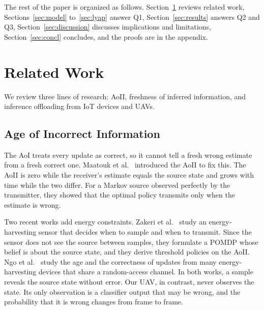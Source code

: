 \documentclass[journal]{IEEEtran}
\theoremstyle{remark}
\begin{document}
The rest of the paper is organized as follows. Section~\ref{sec:related} reviews related work, Sections~\ref{sec:model} to~\ref{sec:lyap} answer Q1, Section~\ref{sec:results} answers Q2 and Q3, Section~\ref{sec:discussion} discusses implications and limitations, Section~\ref{sec:concl} concludes, and the proofs are in the appendix.
\section{Related Work}\label{sec:related}
We review three lines of research: AoII, freshness of inferred information, and inference offloading from IoT devices and UAVs.

\subsection{Age of Incorrect Information}
The AoI treats every update as correct, so it cannot tell a fresh wrong estimate from a fresh correct one. Maatouk et al.~\cite{maatouk2020aoii} introduced the AoII to fix this. The AoII is zero while the receiver's estimate equals the source state and grows with time while the two differ. For a Markov source observed perfectly by the transmitter, they showed that the optimal policy transmits only when the estimate is wrong.

Two recent works add energy constraints. Zakeri et al.~\cite{zakeri2023aoiieh} study an energy-harvesting sensor that decides when to sample and when to transmit. Since the sensor does not see the source between samples, they formulate a POMDP whose belief is about the source state, and they derive threshold policies on the AoII. Ngo et al.~\cite{ngo2025eh} study the age and the correctness of updates from many energy-harvesting devices that share a random-access channel. In both works, a sample reveals the source state without error. Our UAV, in contrast, never observes the state. Its only observation is a classifier output that may be wrong, and the probability that it is wrong changes from frame to frame.
\end{document}
